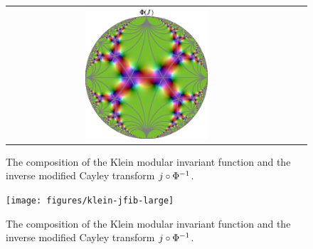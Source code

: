 \begin{figure}
\begin{tabular}{c c c}
\includegraphics[width=0.45\textwidth]{figures/klein-j-mod-cayley}
\end{tabular}
\caption{The composition of the Klein modular invariant function and the inverse modified Cayley transform $j \circ {\Phi}^{-1}$.}
\label{fig_FunctionsOfJ}
\end{figure}

\begin{figure}
\centering
\texttt{[image: figures/klein-jfib-large]}
\caption{The composition of the Klein modular invariant function and the inverse modified Cayley transform $j \circ {\Phi}^{-1}$.}
\label{fig_KleinJFib}
\end{figure}
